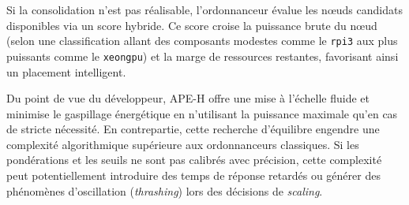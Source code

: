 Si la consolidation n'est pas réalisable, l'ordonnanceur évalue les nœuds candidats disponibles via un score hybride. Ce score croise la puissance brute du nœud (selon une classification allant des composants modestes comme le \texttt{rpi3} aux plus puissants comme le \texttt{xeongpu}) et la marge de ressources restantes, favorisant ainsi un placement intelligent.


Du point de vue du développeur, APE-H offre une mise à l'échelle fluide et minimise le gaspillage énergétique en n'utilisant la puissance maximale qu'en cas de stricte nécessité. En contrepartie, cette recherche d'équilibre engendre une complexité algorithmique supérieure aux ordonnanceurs classiques. Si les pondérations et les seuils ne sont pas calibrés avec précision, cette complexité peut potentiellement introduire des temps de réponse retardés ou générer des phénomènes d'oscillation (\textit{thrashing}) lors des décisions de \textit{scaling}.